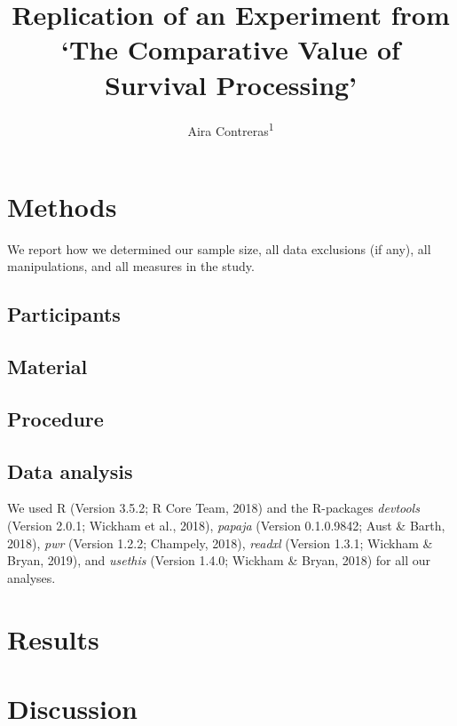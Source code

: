 \documentclass[man]{apa6}
\title{Replication of an Experiment from `The Comparative Value of Survival Processing'}
\author{Aira Contreras\textsuperscript{1}}
\date{}
\affiliation{
\vspace{0.5cm}
\textsuperscript{1} Brooklyn College of the City University of New York}
\begin{document}
\maketitle

\hypertarget{methods}{%
\section{Methods}\label{methods}}

We report how we determined our sample size, all data exclusions (if any), all manipulations, and all measures in the study.

\hypertarget{participants}{%
\subsection{Participants}\label{participants}}

\hypertarget{material}{%
\subsection{Material}\label{material}}

\hypertarget{procedure}{%
\subsection{Procedure}\label{procedure}}

\hypertarget{data-analysis}{%
\subsection{Data analysis}\label{data-analysis}}

We used R (Version 3.5.2; R Core Team, 2018) and the R-packages \emph{devtools} (Version 2.0.1; Wickham et al., 2018), \emph{papaja} (Version 0.1.0.9842; Aust \& Barth, 2018), \emph{pwr} (Version 1.2.2; Champely, 2018), \emph{readxl} (Version 1.3.1; Wickham \& Bryan, 2019), and \emph{usethis} (Version 1.4.0; Wickham \& Bryan, 2018) for all our analyses.

\hypertarget{results}{%
\section{Results}\label{results}}

\hypertarget{discussion}{%
\section{Discussion}\label{discussion}}
\end{document}
